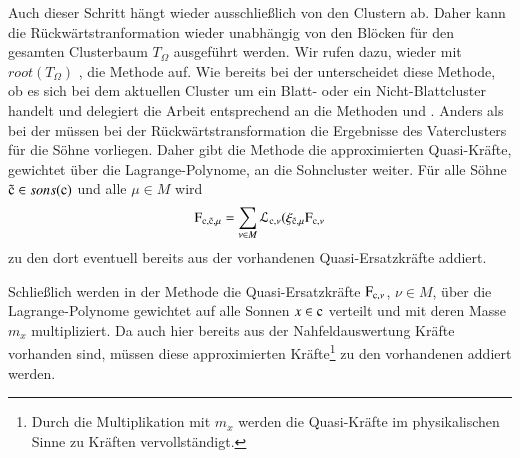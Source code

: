     Auch dieser Schritt hängt wieder ausschließlich von den Clustern ab. Daher kann die Rückwärtstranformation wieder unabhängig von den Blöcken für den gesamten Clusterbaum $T_\Omega$ ausgeführt
    werden. Wir rufen dazu, wieder mit $root(T_\Omega)$ , die Methode  auf. Wie bereits bei der \vorw unterscheidet diese Methode, ob es sich bei
    dem aktuellen Cluster um ein Blatt- oder ein Nicht-Blattcluster handelt und delegiert die Arbeit entsprechend an die Methoden  und 
    . Anders als bei der \vorw müssen bei der Rückwärtstransformation die Ergebnisse des Vaterclusters für die Söhne vorliegen. Daher gibt die
    Methode  die approximierten Quasi-Kräfte, gewichtet über die Lagrange-Polynome, an die Sohncluster weiter. Für alle Söhne $\tilde{\tcode{c}} \in sons(\tcode{c})$
    und alle $\mu \in M$ wird
    \[
      \tcode{F}_{\tcode{c},\tilde{\tcode{c}},\mu} = \sum_{\nu \in M} \lag_{\tcode{c},\nu}(\xi_{\tilde{\tcode{c}},\mu} \tcode{F}_{\tcode{c},\nu}
    \]
    zu den dort eventuell bereits aus der \koppl vorhandenen Quasi-Ersatzkräfte addiert.
    
    Schließlich werden in der Methode  die Quasi-Ersatzkräfte $\tcode{F}_{\tcode{c},\nu}$, $\nu \in M$, über die Lagrange-Polynome gewichtet auf alle Sonnen 
    $x \in \tcode{c}$ verteilt und mit deren Masse $m_x$ multipliziert. Da auch hier bereits aus der Nahfeldauswertung Kräfte vorhanden sind, müssen diese approximierten Kräfte\footnote{Durch die
    Multiplikation mit $m_x$ werden die Quasi-Kräfte im physikalischen Sinne zu Kräften vervollständigt.} zu den vorhandenen addiert werden.
    

  \clearpage